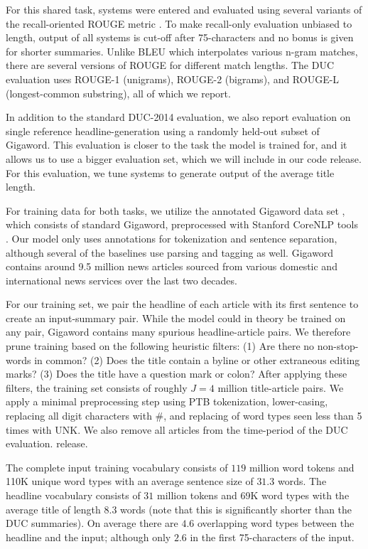 \documentclass[11pt,a4paper]{article}
\begin{document}
For this shared task, systems were entered and evaluated using
several variants of the recall-oriented ROUGE metric \cite{lin2004rouge}. To make
recall-only evaluation unbiased to length, output of all systems is
cut-off after 75-characters and no bonus is given for shorter
summaries. Unlike BLEU which interpolates various n-gram matches,
there are several versions of ROUGE for different match lengths. The
DUC evaluation uses ROUGE-1 (unigrams), ROUGE-2 (bigrams), and ROUGE-L
(longest-common substring), all of which we report.

In addition to the standard DUC-2014 evaluation, we also report
evaluation on single reference headline-generation using a randomly
held-out subset of Gigaword.  This evaluation is closer to the task
the model is trained for, and it allows us to use a bigger evaluation
set, which we will include in our code release. For this evaluation,
we tune systems to generate output of the average title length.

For training data for both tasks, we utilize the annotated Gigaword data set
\cite{graff2003english,napoles2012annotated}, which consists of
standard Gigaword, preprocessed with Stanford CoreNLP tools
\cite{manning2014stanford}. Our model only uses annotations for
tokenization and sentence separation, although several of the
baselines use parsing and tagging as well. Gigaword contains around
9.5 million news articles sourced from various domestic and
international news services over the last two decades.


For our training set, we pair the headline of each article with its
first sentence to create an input-summary pair. While the model could
in theory be trained on any pair, Gigaword contains many spurious
headline-article pairs.  We therefore prune training based on the following
heuristic filters: (1) Are there no non-stop-words in common? (2)
Does the title contain a byline or other extraneous editing marks? (3)
Does the title have a question mark or colon? After applying these
filters, the training set consists of roughly $J=4$ million
title-article pairs. We apply a minimal preprocessing step using 
PTB tokenization, lower-casing, replacing all digit characters with
\#, and replacing of word types seen less than 5 times with UNK.  We
also remove all articles from the time-period of the DUC evaluation. 
release.
 


The complete input training vocabulary consists of $119$ million
word tokens and 110K unique word types with an average sentence size of
$31.3$ words.  The headline vocabulary consists of $31$ million tokens
and 69K word types with the average title of length $8.3$ words (note that this is significantly shorter than the DUC summaries). On average
there are $4.6$ overlapping word types between the headline and the
input; although only $2.6$ in the first 75-characters of the input. 
\end{document}
